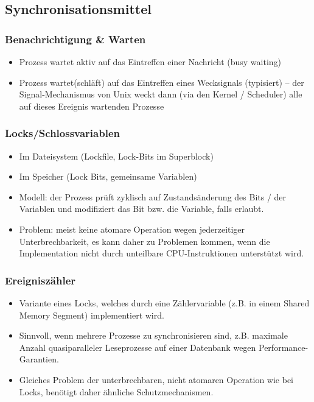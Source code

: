 \documentclass[a4paper, 10pt]{article}
\begin{document}
\subsection{Synchronisationsmittel}

\subsubsection{Benachrichtigung \& Warten}
\begin{itemize}
	\item Prozess wartet aktiv auf das Eintreffen einer Nachricht (busy waiting)
	\item Prozess wartet(schl\"aft) auf das Eintreffen eines Wecksignals (typisiert) – der Signal-Mechanismus von Unix weckt dann (via den Kernel / Scheduler) alle auf dieses Ereignis wartenden Prozesse
\end{itemize}

\subsubsection{Locks/Schlossvariablen}
\begin{itemize}
	\item Im Dateisystem (Lockfile, Lock-Bits im Superblock)
	\item Im Speicher (Lock Bits, gemeinsame Variablen)
	\item Modell: der Prozess pr\"uft zyklisch auf Zustands\"anderung des Bits / der Variablen und modifiziert das Bit bzw. die Variable, falls erlaubt.
	\item Problem: meist keine atomare Operation wegen jederzeitiger Unterbrechbarkeit, es kann daher zu Problemen kommen, wenn die Implementation nicht durch unteilbare CPU-Instruktionen unterst\"utzt wird.
\end{itemize}

\subsubsection{Ereignisz\"ahler}
\begin{itemize}
	\item Variante eines Locks, welches durch eine Z\"ahlervariable (z.B. in einem Shared Memory Segment) implementiert wird.
	\item Sinnvoll, wenn mehrere Prozesse zu synchronisieren sind, z.B. maximale Anzahl quasiparalleler Leseprozesse auf einer Datenbank wegen Performance-Garantien.
	\item Gleiches Problem der unterbrechbaren, nicht atomaren Operation wie bei Locks, benötigt daher \"ahnliche Schutzmechanismen.
\end{itemize}
\end{document}
